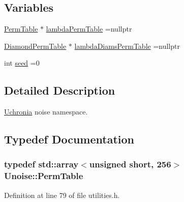 \subsection*{Variables}
\begin{DoxyCompactItemize}
\item 
\hyperlink{namespace_unoise_ae11142038f2dd1bea2711b2b99bbfaf6}{Perm\-Table} $\ast$ \hyperlink{namespace_unoise_acf4515c07424188371eeb9cf77d34fb3}{lambda\-Perm\-Table} =nullptr
\item 
\hyperlink{struct_unoise_1_1_diamond_perm_table}{Diamond\-Perm\-Table} $\ast$ \hyperlink{namespace_unoise_a6a176d9cfecf775dc5366165a3504a12}{lambda\-Diams\-Perm\-Table} =nullptr
\item 
int \hyperlink{namespace_unoise_ae6356ffd0fec247f6d19c762e1757fc3}{seed} =0
\end{DoxyCompactItemize}


\subsection{Detailed Description}
\hyperlink{namespace_uchronia}{Uchronia} noise namespace. 

\subsection{Typedef Documentation}
\hypertarget{namespace_unoise_ae11142038f2dd1bea2711b2b99bbfaf6}{
\subsubsection[{Perm\-Table}]{\setlength{\rightskip}{0pt plus 5cm}typedef std\-::array$<$unsigned short, 256$>$ {\bf Unoise\-::\-Perm\-Table}}}\label{namespace_unoise_ae11142038f2dd1bea2711b2b99bbfaf6}


Definition at line 79 of file utilities.\-h.



